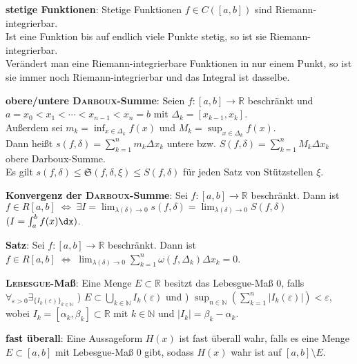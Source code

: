 \textbf{stetige Funktionen}:
Stetige Funktionen $f \in C([a,b])$ sind Riemann-integrierbar. \\
Ist eine Funktion bis auf endlich viele Punkte stetig, so ist sie
Riemann-integrierbar. \\
Verändert man eine Riemann-integrierbare Funktionen in nur einem Punkt,
so ist sie immer noch Riemann-integrierbar und das Integral ist dasselbe.

\linie

\pagebreak

\textbf{obere/untere \textsc{Darboux}-Summe}:
Seien $f: [a,b] \rightarrow \mathbb{R}$ beschränkt und \\
$a = x_0 < x_1 < \cdots < x_{n-1} < x_n = b$ mit
$\Delta_k = [x_{k-1}, x_k]$. \\
Außerdem sei $m_k = \inf_{x \in \Delta_k} f(x)$ und
$M_k = \sup_{x \in \Delta_k} f(x)$. \\
Dann heißt $s(f, \delta) = \sum_{k=1}^n m_k \Delta x_k$ untere bzw.
$S(f, \delta) = \sum_{k=1}^n M_k \Delta x_k$ obere Darboux-Summe. \\
Es gilt $s(f, \delta) \le \mathfrak{S}(f, \delta, \xi) \le S(f, \delta)$
für jeden Satz von Stützstellen $\xi$.

\textbf{Konvergenz der \textsc{Darboux}-Summe}:
Sei $f: [a,b] \rightarrow \mathbb{R}$ beschränkt.
Dann ist \\
$f \in R[a,b] \;\Leftrightarrow\;
\exists I = \lim_{\lambda(\delta) \to 0} s(f, \delta) =
\lim_{\lambda(\delta) \to 0} S(f, \delta)$ \qquad
$(I = \int_a^b f(x)\dx)$.

\textbf{Satz}:
Sei $f: [a,b] \rightarrow \mathbb{R}$ beschränkt.
Dann ist \\
$f \in R[a,b] \;\Leftrightarrow\;
\lim_{\lambda(\delta) \to 0} \sum_{k=1}^n \omega(f, \Delta_k) \Delta x_k = 0$.

\linie

\textbf{\textsc{Lebesgue}-Maß}:
Eine Menge $E \subset \mathbb{R}$ besitzt das Lebesgue-Maß $0$, falls \\
$\forall_{\varepsilon > 0}
\exists_{\{I_k(\varepsilon)\}_{k \in \mathbb{N}}}$ ) $E \subset \bigcup_{k \in \mathbb{N}} I_k(\varepsilon)$ \quad und ) $\sup_{n \in \mathbb{N}} \left(\sum_{k=1}^n |I_k(\varepsilon)|\right) <
\varepsilon$, \\
wobei $I_k = [\alpha_k, \beta_k] \subset \mathbb{R}$ mit $k \in \mathbb{N}$
und $|I_k| = \beta_k - \alpha_k$.

\textbf{fast überall}:
Eine Aussageform $H(x)$ ist fast überall wahr, falls es eine Menge
$E \subset [a,b]$ mit Lebesgue-Maß 0 gibt, sodass $H(x)$ wahr ist auf
$[a,b] \setminus E$.

